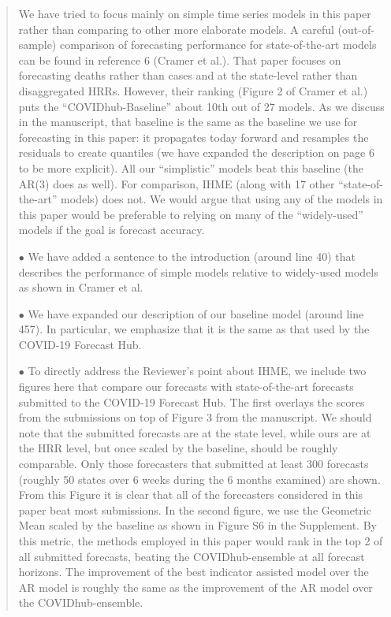 \documentclass[11pt]{article}
\newenvironment{resp}{\begin{quote}\color{cobalt}}{\end{quote}}
\begin{document}
\begin{resp}
  We have tried to focus mainly on simple time series models in this paper
  rather than comparing to other more elaborate models. A careful
  (out-of-sample) comparison of forecasting performance for state-of-the-art
  models can be found in reference 6 (Cramer et al.). That paper focuses on
  forecasting deaths rather than cases and at the state-level rather than
  disaggregated HRRs. However, their ranking (Figure 2 of Cramer et al.) puts the
  ``COVIDhub-Baseline'' about 10th out of 27 models. As we discuss in the
  manuscript, that baseline is  
  the
  same as the baseline we use for forecasting in this paper: it propagates today
  forward and resamples the residuals to create quantiles (we have expanded the
  description on page 6 to be more explicit). All our ``simplistic'' models beat
  this baseline (the AR(3) does as well). For comparison, IHME (along with 17 other
  ``state-of-the-art'' models) does not. We would argue that using any of the
  models in this paper would be preferable to relying on many of the
  ``widely-used'' models if the goal is forecast accuracy.

  $\bullet$ We have added a sentence to the introduction (around line 40) that
  describes the performance of simple models relative to widely-used models as
  shown in Cramer et al.

  $\bullet$ We have expanded our description of our baseline model (around line
  457). In particular, we emphasize that it is the same as that used by the
  COVID-19 Forecast Hub.

  $\bullet$ To directly address the Reviewer's point about IHME, we include two
  figures here
  that compare our forecasts with state-of-the-art forecasts
  submitted to the COVID-19 Forecast Hub. The first overlays the
  scores from the submissions on top of Figure 3 from the manuscript. We should
  note that the submitted forecasts are at the state level, while ours are at
  the HRR level, but once scaled by the baseline, should be roughly comparable.
  Only those forecasters that submitted at least 300 forecasts (roughly 50
  states over 6 weeks during the 6 months examined) are shown. From this Figure
  it is clear that all of the forecasters considered in this paper beat most
  submissions. In the second figure, we use the Geometric Mean scaled by the
  baseline as shown in Figure S6 in the Supplement. By this metric, the methods employed in this
  paper would rank in the top 2 of all submitted forecasts, beating the
  COVIDhub-ensemble at all forecast 
  horizons. The improvement of the best indicator assisted model over the AR model
  is roughly the same as the improvement of the AR model over the
  COVIDhub-ensemble.


\end{resp}
\end{document}

